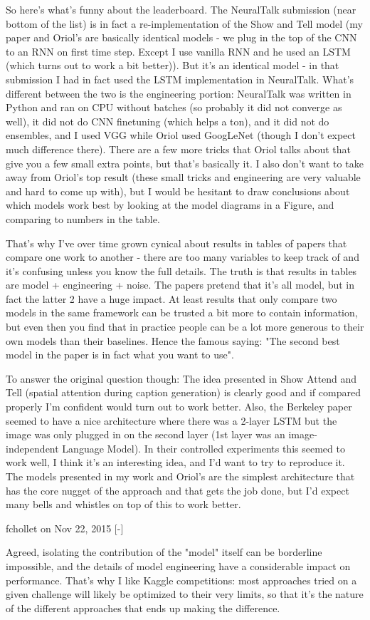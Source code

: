 So here's what's funny about the leaderboard. The NeuralTalk submission (near bottom of the list) is in fact a re-implementation of the Show and Tell model (my paper and Oriol's are basically identical models - we plug in the top of the CNN to an RNN on first time step. Except I use vanilla RNN and he used an LSTM (which turns out to work a bit better)). But it's an identical model - in that submission I had in fact used the LSTM implementation in NeuralTalk.
What's different between the two is the engineering portion: NeuralTalk was written in Python and ran on CPU without batches (so probably it did not converge as well), it did not do CNN finetuning (which helps a ton), and it did not do ensembles, and I used VGG while Oriol used GoogLeNet (though I don't expect much difference there). There are a few more tricks that Oriol talks about that give you a few small extra points, but that's basically it. I also don't want to take away from Oriol's top result (these small tricks and engineering are very valuable and hard to come up with), but I would be hesitant to draw conclusions about which models work best by looking at the model diagrams in a Figure, and comparing to numbers in the table.

That's why I've over time grown cynical about results in tables of papers that compare one work to another - there are too many variables to keep track of and it's confusing unless you know the full details. The truth is that results in tables are model + engineering + noise. The papers pretend that it's all model, but in fact the latter 2 have a huge impact. At least results that only compare two models in the same framework can be trusted a bit more to contain information, but even then you find that in practice people can be a lot more generous to their own models than their baselines. Hence the famous saying: "The second best model in the paper is in fact what you want to use".

To answer the original question though: The idea presented in Show Attend and Tell (spatial attention during caption generation) is clearly good and if compared properly I'm confident would turn out to work better. Also, the Berkeley paper seemed to have a nice architecture where there was a 2-layer LSTM but the image was only plugged in on the second layer (1st layer was an image-independent Language Model). In their controlled experiments this seemed to work well, I think it's an interesting idea, and I'd want to try to reproduce it. The models presented in my work and Oriol's are the simplest architecture that has the core nugget of the approach and that gets the job done, but I'd expect many bells and whistles on top of this to work better.


	
fchollet on Nov 22, 2015 [-]

Agreed, isolating the contribution of the "model" itself can be borderline impossible, and the details of model engineering have a considerable impact on performance.
That's why I like Kaggle competitions: most approaches tried on a given challenge will likely be optimized to their very limits, so that it's the nature of the different approaches that ends up making the difference.




